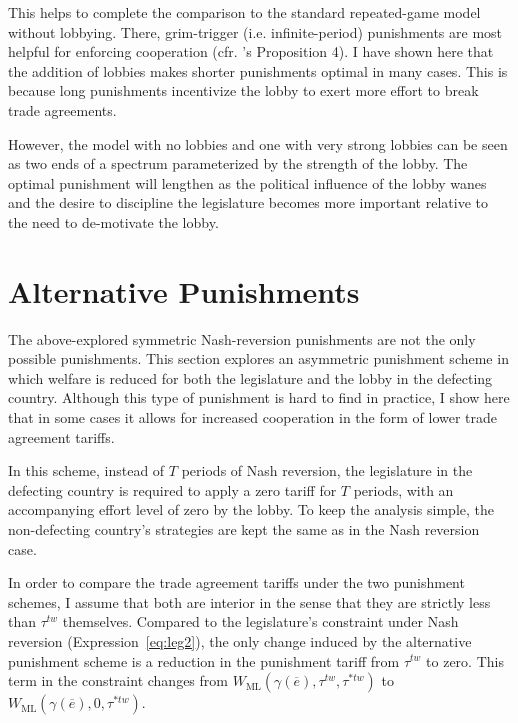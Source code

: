 \documentclass[authoryear, review]{elsarticle}
\newcommand{\ov}{\overline}
\newcommand{\ga}{\gamma}
\begin{document}
This helps to complete the comparison to the standard repeated-game model without lobbying. There, grim-trigger (i.e. infinite-period) punishments are most helpful for enforcing cooperation (cfr. \citet{krw}'s Proposition 4). I have shown here that the addition of lobbies makes shorter punishments optimal in many cases. This is because long punishments incentivize the lobby to exert more effort to break trade agreements.

However, the model with no lobbies and one with very strong lobbies can be seen as two ends of a spectrum parameterized by the strength of the lobby. The optimal punishment will lengthen as the political influence of the lobby wanes and the desire to discipline the legislature becomes more important relative to the need to de-motivate the lobby.








\section{Alternative Punishments}
\label{sec:asymmetric}
The above-explored symmetric Nash-reversion punishments are not the only possible punishments. This section explores an asymmetric punishment scheme in which welfare is reduced for both the legislature and the lobby in the defecting country. Although this type of punishment is hard to find in practice, I show here that in some cases it allows for increased cooperation in the form of lower trade agreement tariffs.

In this scheme, instead of $T$ periods of Nash reversion, the legislature in the defecting country is required to apply a zero tariff for $T$ periods, with an accompanying effort level of zero by the lobby. To keep the analysis simple, the non-defecting country's strategies are kept the same as in the Nash reversion case.

In order to compare the trade agreement tariffs under the two punishment schemes, I assume that both are interior in the sense that they are strictly less than $\tau^{tw}$ themselves. Compared to the legislature's constraint under Nash reversion (Expression~\ref{eq:leg2}), the only change induced by the alternative punishment scheme is a reduction in the punishment tariff from $\tau^{tw}$ to zero. This term in the constraint changes from $W_\text{ML}(\ga(\ov{e}),\tau^{tw},\tau^{*tw})$ to $W_\text{ML}(\ga(\ov{e}),0,\tau^{*tw})$.
\end{document}

